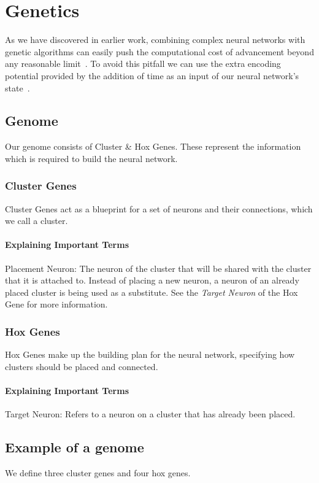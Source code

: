 \section{Genetics}

As we have discovered in earlier work, combining complex neural networks 
with genetic algorithms can easily push the computational cost of advancement
beyond any reasonable limit~\cite{Ferner2017}.
To avoid this pitfall we can use the extra encoding potential provided by 
the addition of time as an input of our neural network's state~\cite{Paugam-Moisy2012}.

\subsection{Genome}
Our genome consists of Cluster \& Hox Genes.
These represent the information which is required to build the neural network.

\subsubsection{Cluster Genes}
Cluster Genes act as a blueprint for a set of neurons and their connections, which we call a cluster.

\paragraph{Explaining Important Terms}
Placement Neuron: The neuron of the cluster that will be shared with the cluster that it is attached to. Instead of placing a new neuron, a neuron of an already placed cluster is being used as a substitute. See the \emph{Target Neuron} of the Hox Gene for more information.

\subsubsection{Hox Genes}
Hox Genes make up the building plan for the neural network,
specifying how clusters should be placed and connected.

\paragraph{Explaining Important Terms}
Target Neuron: Refers to a neuron on a cluster that has already been placed.

\newpage

\label{Example of a genome}
\subsection{Example of a genome}
We define three cluster genes and four hox genes.

